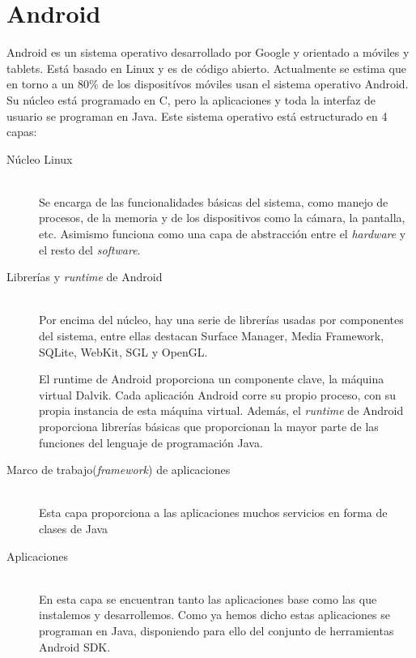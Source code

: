 \documentclass[a4paper,openright, 12pt]{book}
\begin{document}
\section{Android}

Android es un sistema operativo desarrollado por Google y orientado a móviles y tablets. Está basado en Linux y es de código abierto. Actualmente se estima que en torno a un 80\% de los dispositívos móviles usan el sistema operativo Android.
Su núcleo está programado en C, pero la aplicaciones y toda la interfaz de usuario se programan en Java.
Este sistema operativo está estructurado en 4 capas:
\begin{description}
  \item[Núcleo Linux] \hfill \\
  Se encarga de las funcionalidades básicas del sistema, como manejo de procesos, de la memoria y de los dispositivos como la cámara, la pantalla, etc.
   Asimismo funciona como una capa de abstracción entre el \textit{hardware} y el resto del \textit{software}.
   
  \item[Librerías y \textit{runtime} de Android] \hfill \\
  Por encima del núcleo, hay una serie de librerías usadas por componentes del sistema, entre ellas destacan Surface Manager, Media Framework, SQLite, WebKit, SGL y OpenGL.

  El runtime de Android proporciona un componente clave, la máquina virtual Dalvik. Cada aplicación Android corre su propio proceso, con su propia instancia de esta máquina virtual.
  Además, el \textit{runtime} de Android proporciona librerías básicas que proporcionan la mayor parte de las funciones del lenguaje de programación Java.
  
  \item[Marco de trabajo(\textit{framework}) de aplicaciones] \hfill \\
  Esta capa proporciona a las aplicaciones muchos servicios en forma de clases de Java 
  
   \item[Aplicaciones] \hfill \\
  En esta capa se encuentran tanto las aplicaciones base como las que instalemos y desarrollemos. Como ya hemos dicho estas aplicaciones se programan en Java, disponiendo para ello del conjunto de herramientas Android SDK.
\end{description}
\end{document}
